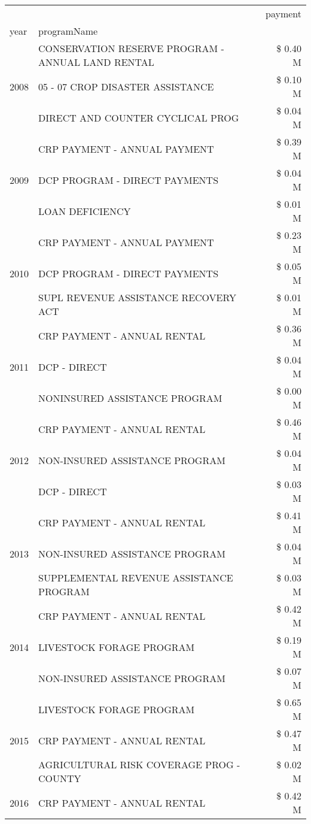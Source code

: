 \begin{tabular}{llr}
\toprule
 &  & payment \\
year & programName &  \\
\midrule
\multirow[t]{3}{*}{2008} & CONSERVATION RESERVE PROGRAM - ANNUAL LAND RENTAL & \$ 0.40 M \\
 & 05 - 07 CROP DISASTER ASSISTANCE & \$ 0.10 M \\
 & DIRECT AND COUNTER CYCLICAL PROG & \$ 0.04 M \\
\cline{1-3}
\multirow[t]{3}{*}{2009} & CRP PAYMENT - ANNUAL PAYMENT & \$ 0.39 M \\
 & DCP PROGRAM - DIRECT PAYMENTS & \$ 0.04 M \\
 & LOAN DEFICIENCY & \$ 0.01 M \\
\cline{1-3}
\multirow[t]{3}{*}{2010} & CRP PAYMENT - ANNUAL PAYMENT & \$ 0.23 M \\
 & DCP PROGRAM - DIRECT PAYMENTS & \$ 0.05 M \\
 & SUPL REVENUE ASSISTANCE RECOVERY ACT & \$ 0.01 M \\
\cline{1-3}
\multirow[t]{3}{*}{2011} & CRP PAYMENT - ANNUAL RENTAL & \$ 0.36 M \\
 & DCP - DIRECT & \$ 0.04 M \\
 & NONINSURED ASSISTANCE PROGRAM & \$ 0.00 M \\
\cline{1-3}
\multirow[t]{3}{*}{2012} & CRP PAYMENT - ANNUAL RENTAL & \$ 0.46 M \\
 & NON-INSURED ASSISTANCE PROGRAM & \$ 0.04 M \\
 & DCP - DIRECT & \$ 0.03 M \\
\cline{1-3}
\multirow[t]{3}{*}{2013} & CRP PAYMENT - ANNUAL RENTAL & \$ 0.41 M \\
 & NON-INSURED ASSISTANCE PROGRAM & \$ 0.04 M \\
 & SUPPLEMENTAL REVENUE ASSISTANCE PROGRAM & \$ 0.03 M \\
\cline{1-3}
\multirow[t]{3}{*}{2014} & CRP PAYMENT - ANNUAL RENTAL & \$ 0.42 M \\
 & LIVESTOCK FORAGE PROGRAM & \$ 0.19 M \\
 & NON-INSURED ASSISTANCE PROGRAM & \$ 0.07 M \\
\cline{1-3}
\multirow[t]{3}{*}{2015} & LIVESTOCK FORAGE PROGRAM & \$ 0.65 M \\
 & CRP PAYMENT - ANNUAL RENTAL & \$ 0.47 M \\
 & AGRICULTURAL RISK COVERAGE PROG - COUNTY & \$ 0.02 M \\
\cline{1-3}
\multirow[t]{3}{*}{2016} & CRP PAYMENT - ANNUAL RENTAL                   & \$ 0.42 M \\

\end{tabular}
